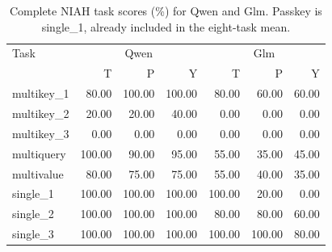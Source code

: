 \begin{table}[ht]
\centering\small
\caption{Complete NIAH task scores (\%) for Qwen and Glm. Passkey is single\_1, already included in the eight-task mean.}
\label{tab:three-method-tasks-qg}
\begin{tabular}{@{}lrrrrrr@{}}
\toprule
Task & \multicolumn{3}{c}{Qwen} & \multicolumn{3}{c}{Glm} \\
 & T & P & Y & T & P & Y \\
\midrule
multikey\_1 & 80.00 & 100.00 & 100.00 & 80.00 & 60.00 & 60.00 \\
multikey\_2 & 20.00 & 20.00 & 40.00 & 0.00 & 0.00 & 0.00 \\
multikey\_3 & 0.00 & 0.00 & 0.00 & 0.00 & 0.00 & 0.00 \\
multiquery & 100.00 & 90.00 & 95.00 & 55.00 & 35.00 & 45.00 \\
multivalue & 80.00 & 75.00 & 75.00 & 55.00 & 40.00 & 35.00 \\
single\_1 & 100.00 & 100.00 & 100.00 & 100.00 & 20.00 & 0.00 \\
single\_2 & 100.00 & 100.00 & 100.00 & 80.00 & 80.00 & 60.00 \\
single\_3 & 100.00 & 100.00 & 100.00 & 100.00 & 100.00 & 80.00 \\
\bottomrule
\end{tabular}
\end{table}
